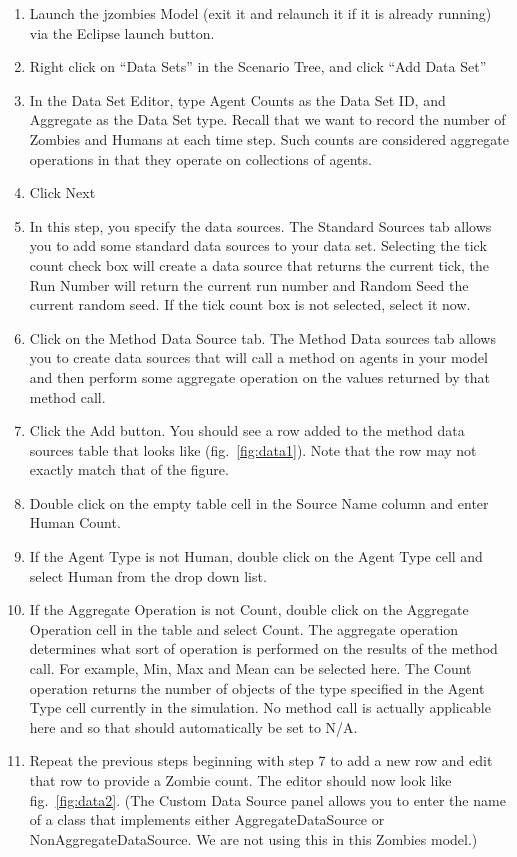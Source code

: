 \documentclass[11pt]{amsart}
\begin{document}
\vspace{.2in}
\begin{enumerate}
\item Launch the jzombies Model (exit it and relaunch it if it is already running) via the Eclipse launch button.
\item Right click on ``Data Sets'' in the Scenario Tree, and click ``Add Data Set''
\item In the Data Set Editor, type Agent Counts as the Data Set ID, and Aggregate as the Data Set type. Recall that we want to 
record the number of Zombies and Humans at each time step. Such counts are considered aggregate operations in that they operate on collections of agents.
\item Click Next
\item In this step, you specify the data sources. The Standard Sources tab allows you to add some standard data sources to your data set. Selecting the tick count check box will create a data source that returns the current tick, the Run Number will return the current run number and Random Seed the current random seed. If the tick count box is not selected, select it now.
\item Click on the Method Data Source tab. The Method Data sources tab allows you to create data sources that will call a method on agents in your model and then perform some aggregate operation on the values returned by that method call.
\item Click the Add button. You should see a row added to the method data sources table that looks like  (fig.~\ref{fig:data1}). Note that the row may not exactly match that of the figure.
\item Double click on the empty table cell in the Source Name column and enter Human Count. 
\item If the Agent Type is not Human, double click on the Agent Type cell and select Human from the drop down list.
\item If the Aggregate Operation is not Count, double click on the Aggregate Operation cell in the table and select Count. The aggregate operation determines what sort of operation is performed on the results of the method call. For example, Min, Max and Mean can be selected here. The Count operation returns the number of objects of the type specified in the Agent Type cell currently in the simulation. No method call is actually applicable here and so that should automatically be set to N/A.
\item Repeat the previous steps beginning with step 7 to add a new row and edit that row to provide a Zombie count. The editor should now look like fig.~\ref{fig:data2}. (The Custom Data Source panel allows you to enter the name of a class that implements either AggregateDataSource or NonAggregateDataSource. We are not using this in this Zombies model.)

\end{enumerate}
\end{document}
